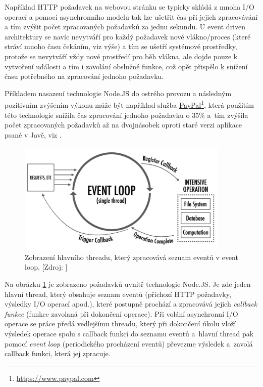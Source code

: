 \documentclass[thesis=M,czech]{FITthesis}[2012/06/26]
\newcommand\fnurl[2]{\href{#2}{#1}\footnote{\url{#2}}}
\begin{document}
	Například HTTP požadavek na webovou stránku se typicky skládá z mnoha I/O operací a pomocí asynchronního modelu tak lze ušetřit čas při jejich zpracovávání a tím zvýšit počet zpracovaných požadavků za jednu sekundu. U event driven architektury se navíc nevytváří pro každý požadavek nové vlákno/proces (které stráví mnoho času čekáním, viz výše) a tím se ušetří systémové prostředky, protože se nevytváří vždy nové prostředí pro běh vlákna, ale dojde pouze k vytvoření události a tím i zavolání obslužné funkce, což opět přispělo k snížení času potřebného na zpracování jednoho požadavku.
	
	Příkladem nasazení technologie Node.JS do ostrého provozu a následným pozitivním zvýšením výkonu může být například služba \fnurl{PayPal}{https://www.paypal.com}, která použitím této technologie snížila čas zpracování jednoho požadavku o 35\% a~tím zvýšila počet zpracovaných požadavků až na dvojnásobek oproti staré verzi aplikace psané v Javě, viz \cite{WebNodeJSPayPal}.


\begin{figure}[h]
	\includegraphics[width=0.9\textwidth]{images/node_event_loop}
 	\caption[Funkcionalita hlavního threadu v technologii Node.JS]{Zobrazení hlavního threadu, který zpracovává seznam eventů v event loop. [Zdroj: \cite{NodeLoop}]}
 	\label{fig:event_loop} 	
\end{figure}

	Na obrázku \ref{fig:event_loop} je zobrazeno požadavků uvnitř technologie Node.JS. Je zde jeden hlavní thread, který obsahuje seznam eventů (příchozí HTTP požadavky, výsledky I/O operací apod.), které postupně prochází a zpracovává jejich \textit{callback funkce} (funkce zavolaná při dokončení operace). Při volání asynchronní I/O operace se práce předá vedlejšímu threadu, který při dokončení úkolu vloží výsledek operace spolu s callback funkcí do seznamu eventů a~hlavní thread pak pomocí \textit{event loop} (periodického procházení eventů) převezme výsledek a~zavolá callback funkci, která jej zpracuje.
	
\end{document}
